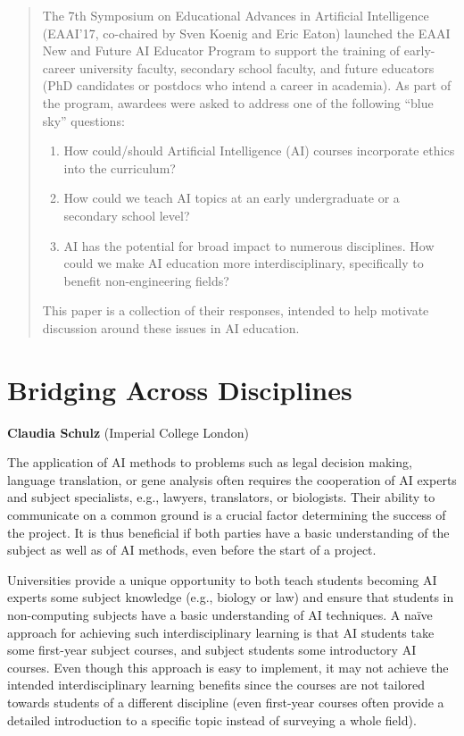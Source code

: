 \documentclass[letterpaper]{article}
\begin{document}
\begin{abstract}
The 7th Symposium on Educational Advances in Artificial Intelligence (EAAI'17, co-chaired by Sven Koenig and Eric Eaton) launched the EAAI New and Future AI Educator Program to support the training of early-career university faculty, secondary school faculty, and future educators (PhD candidates or postdocs who intend a career in academia).  As part of the program, awardees were asked to address one of the following ``blue sky'' questions: 
\begin{enumerate}
    \item How could/should Artificial Intelligence (AI) courses incorporate ethics into the curriculum?
    \item How could we teach AI topics at an early undergraduate or a secondary school level?
    \item AI has the potential for broad impact to numerous disciplines. How could we make AI education more interdisciplinary, specifically to benefit non-engineering fields? 
\end{enumerate}
This paper is a collection of their responses, intended to help motivate discussion around these issues in AI education.
\end{abstract}


\section{Bridging Across Disciplines}
\begin{center}
{\bf Claudia Schulz} (Imperial College London)
\end{center}

The application of AI methods to problems such as legal decision making, language translation, or gene analysis often requires the cooperation of AI experts and subject specialists, e.g., lawyers, translators, or biologists. Their ability to communicate on a common ground is a crucial factor determining the success of the project. It is thus beneficial if both parties have a basic understanding of the subject as well as of AI methods, even before the start of a project.

Universities provide a unique opportunity to both teach students becoming AI experts some subject knowledge (e.g., biology or law) and ensure that students in non-computing subjects have a basic understanding of AI techniques. A na\"{i}ve approach for achieving such interdisciplinary learning is that AI students take some first-year subject courses, and subject students some introductory AI courses. Even though this approach is easy to implement, it may not achieve the intended interdisciplinary learning benefits since the courses are not tailored towards students of a different discipline (even first-year courses often provide a detailed introduction to a specific topic instead of surveying a whole field). 
\end{document}
